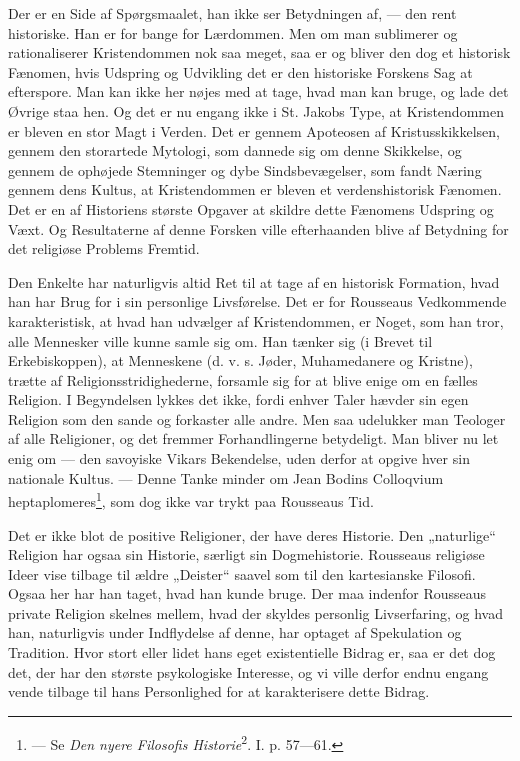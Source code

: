 \documentclass[12pt,a4paper,openany]{book}
\newcommand{\opage}[1]{\marginnote{\footnotesize\textit{[#1]}}}
\begin{document}
Der er en Side af Spørgsmaalet, han ikke ser Betydningen
af, --- den rent historiske. Han er for bange for Lærdommen.
Men om man sublimerer og rationaliserer Kristendommen nok
saa meget, saa er og bliver den dog et historisk Fænomen,
hvis Udspring og Udvikling det er den historiske Forskens Sag
at efterspore. Man kan ikke her nøjes med at tage, hvad man
kan bruge, og lade det Øvrige staa hen. Og det er nu engang
ikke i St. Jakobs Type, at Kristendommen er bleven en stor
Magt i Verden. Det er gennem Apoteosen af Kristusskikkelsen,
gennem den storartede Mytologi, som dannede sig om denne
Skikkelse, og gennem de ophøjede Stemninger og dybe Sindsbevægelser,
som fandt Næring gennem dens Kultus, at Kristendommen
er bleven et verdenshistorisk Fænomen. Det er en
af Historiens største Opgaver at skildre dette Fænomens Udspring
og Væxt. Og Resultaterne af denne Forsken ville efterhaanden
blive af Betydning for det religiøse Problems Fremtid.

Den Enkelte har naturligvis altid Ret til at tage af en
historisk Formation, hvad han har Brug for i sin personlige
Livsførelse. Det er for Rousseaus Vedkommende karakteristisk,
at hvad han udvælger af Kristendommen, er Noget, som han
tror, alle Mennesker ville kunne samle sig om. Han tænker
sig (i Brevet til Erkebiskoppen), at Menneskene (d. v. s. Jøder,
Muhamedanere og Kristne), trætte af Religionsstridighederne,
forsamle sig for at blive enige om en fælles Religion. I Begyndelsen
lykkes det ikke, fordi enhver Taler hævder sin egen
Religion som den sande og forkaster alle andre. Men saa udelukker
man Teologer af alle Religioner, og det fremmer
Forhandlingerne betydeligt. Man bliver nu let enig om --- den
savoyiske Vikars Bekendelse, uden derfor at opgive hver sin
nationale Kultus. --- Denne Tanke minder om Jean Bodins
Colloqvium heptaplomeres\footnote[1]{--- Se \textit{Den nyere Filosofis Historie}\textsuperscript{2}. I. p. 57---61.}, som dog ikke var trykt paa Rousseaus
Tid.

\setcounter{footnote}{0}%
\opage{159}Det er ikke blot de positive Religioner, der have deres
Historie. Den „naturlige“ Religion har ogsaa sin Historie, særligt
sin Dogmehistorie. Rousseaus religiøse Ideer vise tilbage
til ældre „Deister“ saavel som til den kartesianske Filosofi.
Ogsaa her har han taget, hvad han kunde bruge. Der maa
indenfor Rousseaus private Religion skelnes mellem, hvad der
skyldes personlig Livserfaring, og hvad han, naturligvis under
Indflydelse af denne, har optaget af Spekulation og Tradition.
Hvor stort eller lidet hans eget existentielle Bidrag er, saa er
det dog det, der har den største psykologiske Interesse, og vi
ville derfor endnu engang vende tilbage til hans Personlighed
for at karakterisere dette Bidrag.
\end{document}
